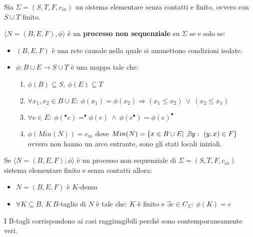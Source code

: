 \begin{definizione}
    Sia $\Sigma = (S, T, F, c_{in})$ un sistema elementare senza contatti e finito,
    ovvero con $S \cup T$ finito.

    $\langle N = (B, E, F), \phi \rangle$ è un \textbf{processo non sequenziale}
    su $\Sigma$ se e solo se:
    \begin{itemize}
        \item $(B, E, F)$ è una rete causale nella quale si ammettono condizioni
              isolate.
        \item $\phi: B \cup E \to S \cup T$ è una mappa tale che:
              \begin{enumerate}
                  \item $\phi(B) \subseteq S, \ \phi(E) \subseteq T$
                  \item $\forall x_1, x_2 \in B \cup E: \ \phi(x_1) = \phi(x_2)
                            \Rightarrow (x_1 \leq x_2) \ \lor \ (x_2 \leq x_1)$
                  \item $\forall e \in E: \ \phi(^{\bullet}e) = ^{\bullet}\phi(e)
                            \ \land \ \phi(e^{\bullet}) = \phi(e)^{\bullet}$
                  \item $\phi(Min(N)) = c_{in}$ dove
                        $Min(N) = \{x \in B \cup E | \not\exists y: \ (y, x) \in F\}$
                        ovvero non hanno un arco entrante, sono gli stati locali
                        iniziali.
              \end{enumerate}
    \end{itemize}
\end{definizione}
Se $\langle N = (B, E, F); \phi \rangle$ è un processo non sequenziale di
$\Sigma = (S, T, F, c_{in})$ sistema elementare finito e senza contatti allora:
\begin{itemize}
    \item $N = (B, E, F)$ è $K$-densa
    \item $\forall K \subseteq B$, $K\ B$-taglio di $N$ è tale che: $K$ è finito e
          $\exists c \in C_{\Sigma}: \ \phi(K) = c$
\end{itemize}
I B-tagli corrispondono ai casi raggiungibili perché sono contemporaneamente veri.
